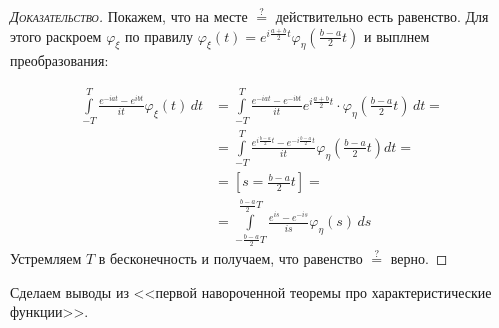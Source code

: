 \documentclass[../main.tex]{subfiles}
\begin{document}
\begin{proof}[\normalfont\textsc{Доказательство}]
	Покажем, что на месте $\overset{?}{=}$ действительно есть равенство. Для этого раскроем $\varphi_{\xi} $ по правилу $\varphi_\xi(t) = e^{i \frac{a+b}{2}t}\varphi_\eta\left(\frac{b-a}{2}t\right)$ и выплнем преобразования:	

	\begin{align*}
		\int\limits_{-T}^{T} \frac{e^{-iat} - e^{ibt}}{it} \varphi_{\xi}(t)\,dt &= \int\limits_{-T}^{T} \frac{e^{-iat}-e^{-ibt}}{it}e^{i \frac{a+b}{2} t} \cdot \varphi_\eta \left( \frac{b-a}{2}t \right)\,dt = \\
   &= \int\limits_{-T}^{T} \frac{e^{i \frac{b-a}{2}t} -e^{-i \frac{b-a}{2} t}}{it} \varphi_\eta \left( \frac{b-a}{2}t \right)dt = \\
   &= \left[s = \frac{b - a}{2} t\right] = \\
   &= \int\limits_{- \frac{b-a}{2}T}^{\frac{b-a}{2}T} \frac{e^{is}-e^{-is}}{is}\varphi_\eta(s)\,ds 
	\end{align*}
	Устремляем $T$ в бесконечность и получаем, что равенство $\overset{?}{=}$ верно.
\end{proof}

Сделаем выводы из <<первой навороченной теоремы про характеристические функции>>.
\end{document}
